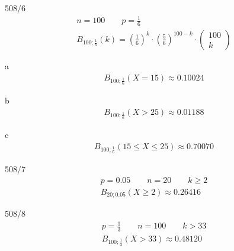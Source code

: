 \begin{exercise}{508/6}
  \begin{gather*}
    n = 100 \qquad p = \frac{1}{6} \\
    B_{100;\frac{1}{6}}(k) = (\frac{1}{6})^k \cdot (\frac{5}{6})^{100 - k} \cdot \begin{pmatrix}100 \\ k\end{pmatrix}
  \end{gather*}
  \item [a]
  \begin{gather*}
    B_{100;\frac{1}{6}}(X = 15) \approx 0.10024
  \end{gather*}
  \item [b]
  \begin{gather*}
    B_{100;\frac{1}{6}}(X > 25) \approx 0.01188
  \end{gather*}
  \item [c]
  \begin{gather*}
    B_{100;\frac{1}{6}}(15 \leq X \leq 25) \approx 0.70070
  \end{gather*}
\end{exercise}
\begin{exercise}{508/7}
  \begin{gather*}
    p = 0.05 \qquad n = 20 \qquad k \geq 2 \\
    B_{20;0.05}(X \geq 2) \approx 0.26416
  \end{gather*}
\end{exercise}
\begin{exercise}{508/8}
  \begin{gather*}
    p = \frac{1}{3} \qquad n = 100 \qquad k > 33 \\
    B_{100;\frac{1}{3}}(X > 33) \approx 0.48120
  \end{gather*}
\end{exercise}
